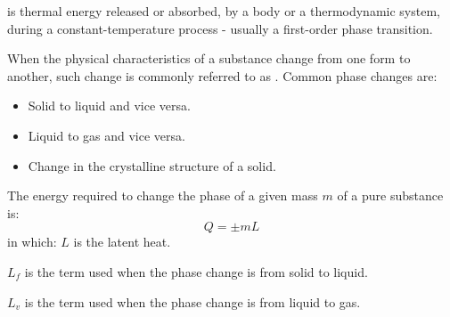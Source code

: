     \par {} is thermal energy released or absorbed, by a body or a
    thermodynamic system, during a constant-temperature process - usually a first-order
    phase transition.
    \par When the physical characteristics of a substance change from one form to
    another, such change is commonly referred to as . Common phase
    changes are:
    \begin{itemize}
        \item Solid to liquid and vice versa. 
        \item Liquid to gas and vice versa. 
        \item Change in the crystalline structure of a solid.
    \end{itemize}
    \par The energy required to change the phase of a given mass $m$ of a pure substance is:
    \begin{equation}
        Q = \pm mL
    \end{equation}
    in which: $L$ is the latent heat.
    \par {} $L_{f}$ is the term used when the phase change is
    from solid
    to liquid.
    \par {} $L_{v}$ is the term used when the phase
    change is from liquid to gas.

